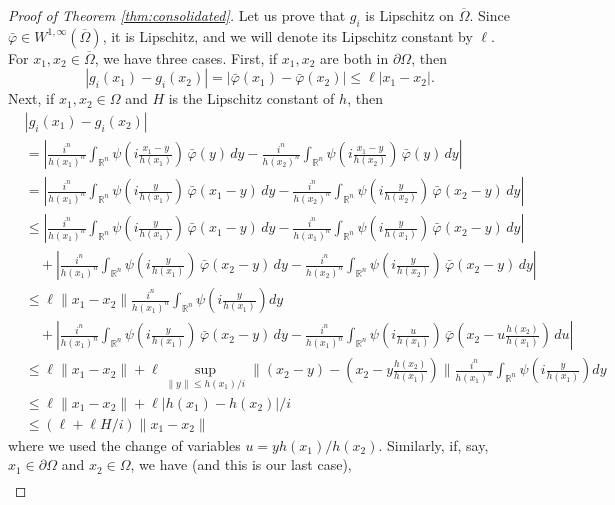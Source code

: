 \documentclass{article}
\newcommand{\R}{\mathbb{R}}
\theoremstyle{definition}
\theoremstyle{remark}
\begin{document}
\begin{proof}[Proof of Theorem \ref{thm:consolidated}]
 Let us prove that $g_i$ is Lipschitz on $\overline \Omega$. Since $\bar\varphi\in W^{1,\infty}(\overline\Omega)$, it is Lipschitz, and we will denote its Lipschitz constant by $\ell$. For $x_1,x_2\in\overline\Omega$, we have three cases. First, if $x_1,x_2$ are both in $\partial\Omega$, then 
 \[|g_i(x_1)-g_i(x_2)|=|\bar\varphi(x_1)-\bar\varphi(x_2)|\leq \ell|x_1-x_2|.\]
 Next, if $x_1,x_2\in \Omega$ and $H$ is the Lipschitz constant of $h$, then
 \begin{align*}
     &|g_i(x_1)-g_i(x_2)|\\
     &=\left|\frac{i^n}{h(x_1)^n}\int_{\R^n}\psi\left(i\frac{x_1-y}{h(x_1)}\right)\,\bar\varphi(y)\,dy-\frac{i^n}{h(x_2)^n}\int_{\R^n}\psi\left(i\frac{x_1-y}{h(x_2)}\right)\,\bar\varphi(y)\,dy\right|\\
     &=\left|\frac{i^n}{h(x_1)^n}\int_{\R^n}\psi\left(i\frac{y}{h(x_1)}\right)\,\bar\varphi(x_1-y)\,dy-\frac{i^n}{h(x_2)^n}\int_{\R^n}\psi\left(i\frac{y}{h(x_2)}\right)\,\bar\varphi(x_2-y)\,dy\right|\\
     &\leq 
     \left|\frac{i^n}{h(x_1)^n}\int_{\R^n}\psi\left(i\frac{y}{h(x_1)}\right)\,\bar\varphi(x_1-y)\,dy-\frac{i^n}{h(x_1)^n}\int_{\R^n}\psi\left(i\frac{y}{h(x_1)}\right)\,\bar\varphi(x_2-y)\,dy\right|\\
     &\quad+\left|\frac{i^n}{h(x_1)^n}\int_{\R^n}\psi\left(i\frac{y}{h(x_1)}\right)\,\bar\varphi(x_2-y)\,dy-\frac{i^n}{h(x_2)^n}\int_{\R^n}\psi\left(i\frac{y}{h(x_2)}\right)\,\bar\varphi(x_2-y)\,dy\right|\\
     &\leq \ell\|x_1-x_2\|\frac{i^n}{h(x_1)^n}\int_{\R^n}\psi\left(i\frac{y}{h(x_1)}\right)dy \\
     &\quad +\left|\frac{i^n}{h(x_1)^n}\int_{\R^n}\psi\left(i\frac{y}{h(x_1)}\right)\,\bar\varphi(x_2-y)\,dy-\frac{i^n}{h(x_1)^n}\int_{\R^n}\psi\left(i\frac{u}{h(x_1)}\right)\,\bar\varphi\left(x_2-u\frac{h(x_2)}{h(x_1)}\right)\,du\right|\\
     &\leq \ell\|x_1-x_2\|+\ell\sup_{\|y\|\leq h(x_1)/i}\|(x_2-y)-(x_2-y\tfrac{h(x_2)}{h(x_1)})\|\frac{i^n}{h(x_1)^n}\int_{\R^n}\psi\left(i\frac{y}{h(x_1)}\right)dy  \\
     &\leq \ell\|x_1-x_2\|+\ell|h(x_1)-h(x_2)|/i\\
     &\leq (\ell+\ell H/i)\|x_1-x_2\|
 \end{align*}
 where we used the change of variables $u=yh(x_1)/h(x_2)$.
 Similarly, if, say, $x_1\in\partial\Omega$ and $x_2\in\Omega$, we have (and this is our last case),
 \begin{align*}

\end{align*}
\end{proof}
\end{document}
